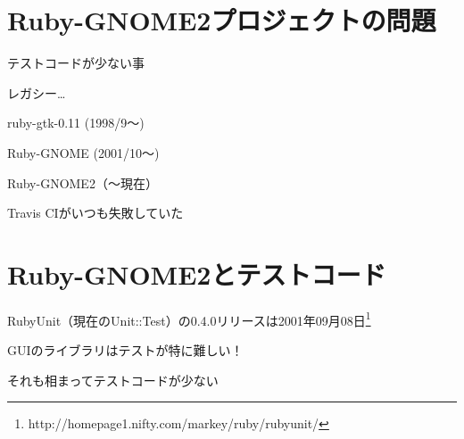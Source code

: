 \section{Ruby-GNOME2プロジェクトの問題}

\begin{frame}
\begin{itemize}
{\Large
\item{} テストコードが少ない事
\item{} レガシー…

ruby-gtk-0.11 (1998/9〜)

Ruby-GNOME (2001/10〜)

Ruby-GNOME2（〜現在）
}
{\huge
\item{} Travis CIがいつも失敗していた
}
\end{itemize}
\end{frame}

\section{Ruby-GNOME2とテストコード}

\begin{frame}
\begin{itemize}
{\Large
\item RubyUnit（現在のUnit::Test）の0.4.0リリースは2001年09月08日\footnote{http://homepage1.nifty.com/markey/ruby/rubyunit/}
\item GUIのライブラリはテストが特に難しい！
\item それも相まってテストコードが少ない
}
\end{itemize}
\end{frame}
